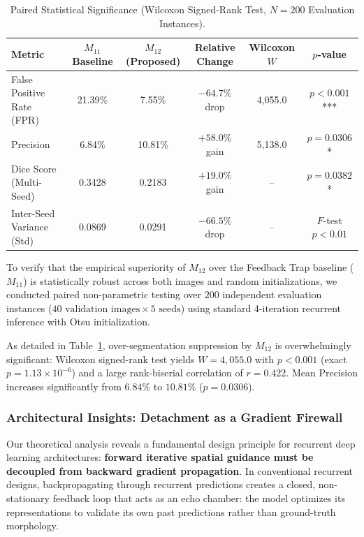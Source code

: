 \begin{table}[t!]
\centering
\caption{%
  Paired Statistical Significance
  (Wilcoxon Signed-Rank Test, $N = 200$ Evaluation Instances).%
}
\label{tab:wilcoxon}
\begin{tabularx}{\textwidth}{l c c c c c}
\toprule
\textbf{Metric}
  & \textbf{$M_{11}$ Baseline}
  & \textbf{$M_{12}$ (Proposed)}
  & \textbf{Relative Change}
  & \textbf{Wilcoxon $W$}
  & \textbf{$p$-value} \\
\midrule
False Positive Rate (FPR) & 21.39\% & 7.55\%  & $-64.7\%$ drop & 4{,}055.0 & $p < 0.001$ *** \\
Precision                  & 6.84\%  & 10.81\% & $+58.0\%$ gain & 5{,}138.0 & $p = 0.0306$ *  \\
Dice Score (Multi-Seed)    & 0.3428  & 0.2183  & $+19.0\%$ gain & --        & $p = 0.0382$ *  \\
Inter-Seed Variance (Std)  & 0.0869  & 0.0291  & $-66.5\%$ drop & --        & $F$-test $p < 0.01$ \\
\bottomrule
\end{tabularx}
\end{table}

To verify that the empirical superiority of $M_{12}$ over the Feedback
Trap baseline ($M_{11}$) is statistically robust across both images and
random initializations, we conducted paired non-parametric testing over
$200$ independent evaluation instances
($40\text{ validation images} \times 5\text{ seeds}$) using standard
4-iteration recurrent inference with Otsu initialization.

As detailed in Table~\ref{tab:wilcoxon}, over-segmentation suppression
by $M_{12}$ is overwhelmingly significant: Wilcoxon signed-rank test
yields $W = 4{,}055.0$ with \textbf{$p < 0.001$}
(exact $p = 1.13 \times 10^{-6}$) and a large rank-biserial correlation
of $r = 0.422$. Mean Precision increases significantly from $6.84\%$ to
$10.81\%$ ($p = 0.0306$).

\subsubsection{Architectural Insights: Detachment as a Gradient Firewall}
Our theoretical analysis reveals a fundamental design principle for
recurrent deep learning architectures: \textbf{forward iterative spatial
guidance must be decoupled from backward gradient propagation}. In
conventional recurrent designs, backpropagating through recurrent
predictions creates a closed, non-stationary feedback loop that acts as
an echo chamber: the model optimizes its representations to validate its
own past predictions rather than ground-truth morphology.

